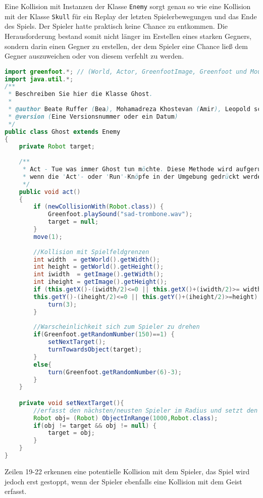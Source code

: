 \documentclass{pi1}
\begin{document}
Eine Kollision mit Instanzen der Klasse  \texttt{Enemy} sorgt genau so wie eine Kollision mit der Klasse  \texttt{Skull} für ein Replay der letzten Spielerbewegungen und das Ende des Spiels.
Der Spieler hatte praktisch keine Chance zu entkommen. Die Herausforderung bestand somit nicht länger im Erstellen eines starken Gegners, sondern darin einen Gegner zu erstellen, der dem Spieler eine Chance ließ dem Gegner auszuweichen oder von diesem verfehlt zu werden.

\begin{lstlisting}[caption={Klasse \emph{Ghost}},firstnumber=1, language=Java]
import greenfoot.*; // (World, Actor, GreenfootImage, Greenfoot und MouseInfo)
import java.util.*;
/**
 * Beschreiben Sie hier die Klasse Ghost.
 * 
 * @author Beate Ruffer (Bea), Mohamadreza Khostevan (Amir), Leopold schulz-Hanke (Leo) 
 * @version (Eine Versionsnummer oder ein Datum)
 */
public class Ghost extends Enemy
{
    private Robot target; 
    
    /**
     * Act - Tue was immer Ghost tun möchte. Diese Methode wird aufgerufen,
     * wenn die 'Act'- oder 'Run'-Knöpfe in der Umgebung gedrückt werden.
     */
    public void act() 
    {
        if (newCollisionWith(Robot.class)) {
            Greenfoot.playSound("sad-trombone.wav");
            target = null;
        }
        move(1);
        
        //Kollision mit Spielfeldgrenzen
        int width  = getWorld().getWidth();
        int height = getWorld().getHeight();
        int iwidth  = getImage().getWidth();
        int iheight = getImage().getHeight();
        if (this.getX()-(iwidth/2)<=0 || this.getX()+(iwidth/2)>= width||
        this.getY()-(iheight/2)<=0 || this.getY()+(iheight/2)>=height) {
            turn(3);
        }
        
        //Warscheinlichkeit sich zum Spieler zu drehen
        if(Greenfoot.getRandomNumber(150)==1) {
            setNextTarget();
            turnTowardsObject(target);
        }
        else{
            turn(Greenfoot.getRandomNumber(6)-3);
        }
    }

    private void setNextTarget(){
        //erfasst den nächsten/neusten Spieler im Radius und setzt den Geist auf diesen an
        Robot obj= (Robot) ObjectInRange(1000,Robot.class);
        if(obj != target && obj != null) {
            target = obj;
        }
    }
}
\end{lstlisting}
Zeilen 19-22 erkennen eine potentielle Kollision mit dem Spieler, das Spiel wird jedoch erst gestoppt, wenn der Spieler ebenfalls eine Kollision mit dem Geist erfasst.
\end{document}
